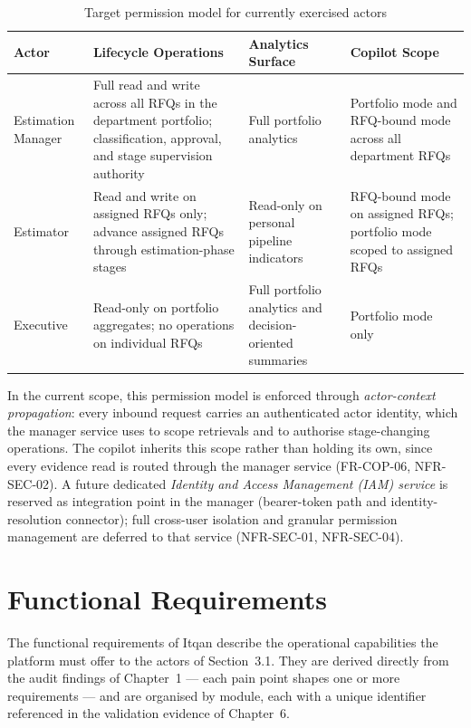 \begin{table}[H]
\centering
\renewcommand{\arraystretch}{1.3}
\scriptsize
\begin{tabularx}{\textwidth}{|p{2.5cm}|>{\RaggedRight\arraybackslash}X|>{\RaggedRight\arraybackslash}X|>{\RaggedRight\arraybackslash}X|}
\hline
\rowcolor{lightgray}
\textbf{Actor} & \textbf{Lifecycle Operations} & \textbf{Analytics Surface} & \textbf{Copilot Scope} \\ \hline
Estimation Manager & Full read and write across all RFQs in the department portfolio; classification, approval, and stage supervision authority & Full portfolio analytics & Portfolio mode and RFQ-bound mode across all department RFQs \\ \hline
Estimator & Read and write on assigned RFQs only; advance assigned RFQs through estimation-phase stages & Read-only on personal pipeline indicators & RFQ-bound mode on assigned RFQs; portfolio mode scoped to assigned RFQs \\ \hline
Executive & Read-only on portfolio aggregates; no operations on individual RFQs & Full portfolio analytics and decision-oriented summaries & Portfolio mode only \\ \hline
\end{tabularx}
\caption{Target permission model for currently exercised actors}
\label{tab:permissions}
\end{table}

In the current scope, this permission model is enforced through \textit{actor-context propagation}: every inbound request carries an authenticated actor identity, which the manager service uses to scope retrievals and to authorise stage-changing operations. The copilot inherits this scope rather than holding its own, since every evidence read is routed through the manager service (FR-COP-06, NFR-SEC-02). A future dedicated \textit{Identity and Access Management (IAM) service} is reserved as integration point in the manager (bearer-token path and identity-resolution connector); full cross-user isolation and granular permission management are deferred to that service (NFR-SEC-01, NFR-SEC-04).


\section{Functional Requirements}
The functional requirements of Itqan describe the operational capabilities the platform must offer to the actors of Section~3.1. They are derived directly from the audit findings of Chapter~1 --- each pain point shapes one or more requirements --- and are organised by module, each with a unique identifier referenced in the validation evidence of Chapter~6.

